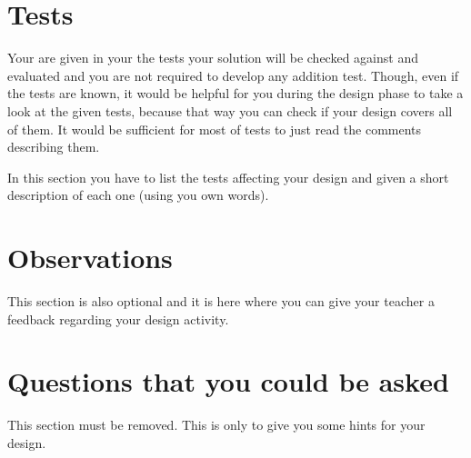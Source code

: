\section{Tests}

Your are given in your \OSName{} the tests your solution will be checked against and evaluated and you are not required to develop any addition test. Though, even if the tests are known, it would be helpful for you during the design phase to take a look at the given tests, because that way you can check if your design covers all of them. It would be sufficient for most of tests to just read the comments describing them.

In this section you have to list the tests affecting your design and given a short description of each one (using you own words).


\section{Observations}

This section is also optional and it is here where you can give your teacher a feedback regarding your design activity.


\section{Questions that you could be asked}

This section must be removed. This is only to give you some hints for your design. 

